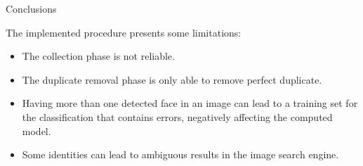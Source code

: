 \begin{tframe}{Conclusions}

The implemented procedure presents some limitations:

\begin{itemize}
\item The collection phase is not reliable.
\item The duplicate removal phase is only able to remove perfect duplicate.
\item Having more than one detected face in an image can lead to a training set for the classification that contains errors, negatively affecting the computed model.
\item Some identities can lead to ambiguous results in the image search engine.
\end{itemize}

\end{tframe}
